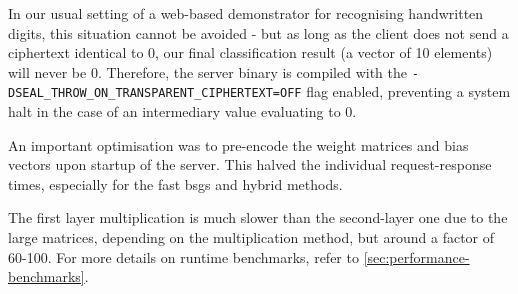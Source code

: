 In our usual setting of a web-based demonstrator for recognising handwritten digits, this situation cannot be avoided - but as long as the client does not send a ciphertext identical to $0$, our final classification result (a vector of 10 elements) will never be $0$.
Therefore, the server binary is compiled with the \texttt{-DSEAL\_THROW\_ON\_TRANSPARENT\_CIPHERTEXT=OFF} flag enabled, preventing a system halt in the case of an intermediary value evaluating to $0$.

An important optimisation was to pre-encode the weight matrices and bias vectors upon startup of the server.
This halved the individual request-response times, especially for the fast \gls{bsgs} and hybrid methods.

The first layer multiplication is much slower than the second-layer one due to the large matrices, depending on the multiplication method, but around a factor of 60-100.
For more details on runtime benchmarks, refer to \cref{sec:performance-benchmarks}.
